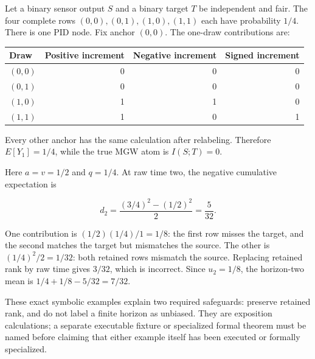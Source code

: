 \clearpage
{}\label{a-sensor-with-no-target-information-can-give-a-positive-short-prefix-mean}

Let a binary sensor output \(S\) and a binary target \(T\) be independent and fair. The four complete rows \((0,0),(0,1),(1,0),(1,1)\) each have probability \(1/4\). There is one PID node. Fix anchor \((0,0)\). The one-draw contributions are:

{\def\LTcaptype{none} %
\begin{longtable}[]{@{}lrrr@{}}
\toprule\noalign{}
Draw & Positive increment & Negative increment & Signed increment \\
\midrule\noalign{}
\endhead
\bottomrule\noalign{}
\endlastfoot
\((0,0)\) & 0 & 0 & 0 \\
\((0,1)\) & 0 & 0 & 0 \\
\((1,0)\) & 1 & 1 & 0 \\
\((1,1)\) & 1 & 0 & 1 \\
\end{longtable}
}

Every other anchor has the same calculation after relabeling. Therefore \(E[Y_1]=1/4\), while the true MGW atom is \(I(S;T)=0\).

Here \(a=v=1/2\) and \(q=1/4\). At raw time two, the negative cumulative expectation is

\[
d_2=\frac{(3/4)^2-(1/2)^2}{2}=\frac5{32}.
\]

One contribution is \((1/2)(1/4)/1=1/8\): the first row misses the target, and the second matches the target but mismatches the source. The other is \((1/4)^2/2=1/32\): both retained rows mismatch the source. Replacing retained rank by raw time gives \(3/32\), which is incorrect. Since \(u_2=1/8\), the horizon-two mean is \(1/4+1/8-5/32=7/32\).

These exact symbolic examples explain two required safeguards: preserve retained rank, and do not label a finite horizon as unbiased. They are exposition calculations; a separate executable fixture or specialized formal theorem must be named before claiming that either example itself has been executed or formally specialized.

\clearpage
{}\label{edge-cases-and-permitted-interpretations}

